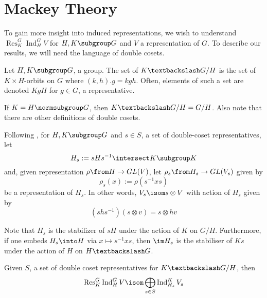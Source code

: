 \documentclass[11pt,leqno,oneside]{amsbook}
\newcommand{\Res}{\operatorname{Res}}
\newcommand{\Ind}{\operatorname{Ind}}
\newcommand{\bs}{\textbackslash}
\numberwithin{thm}{section}
\begin{document}
\section{Mackey Theory}
To gain more insight into induced representations, we wish to
understand \(\Res_K^G \Ind_H^G V\) for \(H,K \subgroup G\) and \(V\) a
representation of \(G\). To describe our results, we will need the
language of double cosets.
\begin{defn}
  Let \(H,K \subgroup G\), a group. The set of 
  \(K\bs G /H\) is the set of \(K \times H\)-orbits on
  \(G\) where \((k,h).g = kgh\). Often, elements of such a set are
  denoted \(KgH\) for \(g \in G\), a representative.
\end{defn}
\begin{rmk}
  If \(K=H \normsubgroup G\), then \(K \bs G / H = G/H\). Also note
  that there are other definitions of double cosets.
\end{rmk}
\begin{defn}
  Following \cite{serre}, for \(H,K \subgroup G\) and \(s \in S\), a set
  of double-coset representatives, let \[
    H_s := sHs^{-1} \intersect K \subgroup K
  \]
  and, given representation \(\rho \from H \to GL(V)\), let \(\rho_s
  \from H_s \to GL(V_s)\) given by \[ 
    \rho_s(x) := \rho(s^{-1}xs)
  \]
  be a representation of \(H_s\). In other words, \(V_s \isom s
  \otimes V\) with action of \(H_s\) given by \[
    (shs^{-1})(s \otimes v) = s \otimes hv
  \]

\end{defn}
\begin{rmk}
  Note that \(H_s\) is the stabilizer of \(sH\) under the action of
  \(K\) on \(G/H\). Furthermore, if one embeds \(H_s \into H\) via \(x
  \mapsto s^{-1}xs\), then \(\im H_s\) is the stabiliser of \(Ks\)
  under the action of \(H\) on \(H \bs G\).
\end{rmk}
\begin{prop}
  Given \(S\), a set of double coset representatives for \(K \bs G /
  H\), then \[
    \Res_K^G \Ind_H^G V \isom \bigoplus_{s \in S} \Ind_{H_s}^K V_s
  \]
\end{prop}
\end{document}
